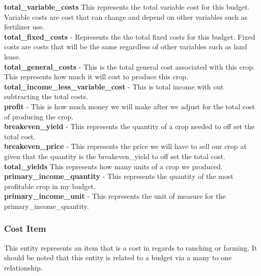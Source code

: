\documentclass[onecolumn, draftclsnofoot,10pt, compsoc]{article}
\begin{document}
				\textbf{total\_variable\_costs} \- This represents the total variable cost for this budget. Variable costs are cost that can change and depend on other variables such as fertilizer use.\\
				
				\textbf{total\_fixed\_costs} - Represents the the total fixed costs for this budget. Fixed costs are costs that will be the same regardless of other variables such as land lease.\\
				
				\textbf{total\_general\_costs} - This is the total general cost associated with this crop. This represents how much it will cost to produce this crop.\\
				
				\textbf{total\_income\_less\_variable\_cost} - This is total income with out subtracting the total costs.\\
				
				\textbf{profit} - This is how much money we will make after we adjust for the total cost of producing the crop.\\
				
				\textbf{breakeven\_yield} - This represents the quantity of a crop needed to off set the total cost.\\
								
				\textbf{breakeven\_price} - This represents the price we will have to sell our crop at given that the quantity is the breakeven\_yield to off set the total cost.\\
				
				\textbf{total\_yields} \- This represents how many units of a crop we produced.\\
				
				\textbf{primary\_income\_quantity} - This represents the quantity of the most profitable crop in my budget.\\
				
				\textbf{primary\_income\_unit} - This represents the unit of measure for the primary\_income\_quantity.\\
				
			\subsubsection{Cost Item}
				This entity represents an item that is a cost in regards to ranching or farming. It should be noted that this entity is related to a budget via a many to one relationship.\\
			
\end{document}
